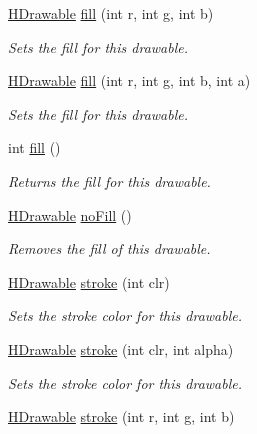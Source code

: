 \begin{DoxyCompactItemize}
\hyperlink{classhype_1_1drawable_1_1_h_drawable}{H\-Drawable} \hyperlink{classhype_1_1drawable_1_1_h_drawable_a675e37a29753adbabf891e7f51ea5508}{fill} (int r, int g, int b)
\begin{DoxyCompactList}\small\item\em Sets the fill for this drawable. \end{DoxyCompactList}\item 
\hyperlink{classhype_1_1drawable_1_1_h_drawable}{H\-Drawable} \hyperlink{classhype_1_1drawable_1_1_h_drawable_a27c54bd6420e20dc3966f407277986b4}{fill} (int r, int g, int b, int a)
\begin{DoxyCompactList}\small\item\em Sets the fill for this drawable. \end{DoxyCompactList}\item 
int \hyperlink{classhype_1_1drawable_1_1_h_drawable_a062e20742be8718d6069e7b50b1ebf36}{fill} ()
\begin{DoxyCompactList}\small\item\em Returns the fill for this drawable. \end{DoxyCompactList}\item 
\hyperlink{classhype_1_1drawable_1_1_h_drawable}{H\-Drawable} \hyperlink{classhype_1_1drawable_1_1_h_drawable_a079450cb1cd0463829ab1c8cb265c762}{no\-Fill} ()
\begin{DoxyCompactList}\small\item\em Removes the fill of this drawable. \end{DoxyCompactList}\item 
\hyperlink{classhype_1_1drawable_1_1_h_drawable}{H\-Drawable} \hyperlink{classhype_1_1drawable_1_1_h_drawable_a6c41a5164d1adab0d4592e88eaf27059}{stroke} (int clr)
\begin{DoxyCompactList}\small\item\em Sets the stroke color for this drawable. \end{DoxyCompactList}\item 
\hyperlink{classhype_1_1drawable_1_1_h_drawable}{H\-Drawable} \hyperlink{classhype_1_1drawable_1_1_h_drawable_a8b04db96fa8ce2c2d2298379c33022fe}{stroke} (int clr, int alpha)
\begin{DoxyCompactList}\small\item\em Sets the stroke color for this drawable. \end{DoxyCompactList}\item 
\hyperlink{classhype_1_1drawable_1_1_h_drawable}{H\-Drawable} \hyperlink{classhype_1_1drawable_1_1_h_drawable_ac271a94299a2cfc04e999e474bd8e31e}{stroke} (int r, int g, int b)

\end{DoxyCompactItemize}
